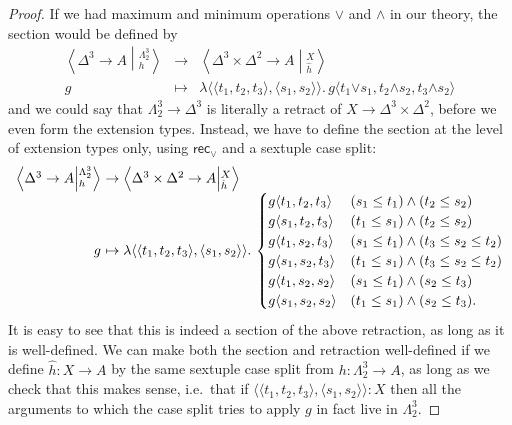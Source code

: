 \documentclass[12pt]{amsart}
\theoremstyle{plain}
\theoremstyle{definition}
\theoremstyle{remark}
\numberwithin{equation}{section}
\newcommand{\ndexten}[4]{\left\langle #1 \to #2 \middle|^{#3}_{#4}\right\rangle}
\newcommand{\pair}[1]{\langle #1\rangle}
\newcommand{\rec}{\mathsf{rec}}
\newcommand{\lam}[1]{\lambda #1.\,}
\begin{document}
\begin{proof}
  If we had maximum and minimum operations $\pmb{\lor}$ and $\pmb{\land}$ in our theory, the section would be defined by
  \[
  \begin{array}{ccc}
    \ndexten{\Delta^3}{A}{\Lambda^3_2}{h} & \to &\ndexten{\Delta^3\times\Delta^2}{A}{X}{\hat h}\\
    g & \mapsto & \lam{\pair{\pair{t_1,t_2,t_3},\pair{s_1,s_2}}} g\pair{t_1 \mathbin{\pmb{\lor}} s_1, t_2 \mathbin{\pmb{\land}} s_2, t_3 \mathbin{\pmb{\land}} s_2}
  \end{array}
  \]
  and we could say that $\Lambda^3_2 \to \Delta^3$ is literally a retract of $X \to \Delta^3\times \Delta^2$, before we even form the extension types.
  Instead, we have to define the section at the level of extension types only, using $\rec_\lor$ and a sextuple case split:
  \[
  \begin{array}{r@{}l}
    \ndexten{\Delta^3}{A}{\Lambda^3_2}{h}\  &\to  \ndexten{\Delta^3\times\Delta^2}{A}{X}{\hat h}\\
    g\  &\mapsto  \lam{\pair{\pair{t_1,t_2,t_3},\pair{s_1,s_2}}}
    \begin{cases}
      g\pair{t_1,t_2,t_3} & (s_1\le t_1) \land (t_2\le s_2)\\
      g\pair{s_1,t_2,t_3} & (t_1\le s_1) \land (t_2\le s_2)\\
      g\pair{t_1,s_2,t_3} & (s_1\le t_1) \land (t_3\le s_2\le t_2)\\
      g\pair{s_1,s_2,t_3} & (t_1\le s_1) \land (t_3\le s_2\le t_2)\\
      g\pair{t_1,s_2,s_2} & (s_1\le t_1) \land (s_2\le t_3)\\
      g\pair{s_1,s_2,s_2} & (t_1\le s_1) \land (s_2\le t_3).
    \end{cases}
  \end{array}
  \]
  It is easy to see that this is indeed a section of the above retraction, as long as it is well-defined.
  We can make both the section and retraction well-defined if we define $\hat h : X \to A$ by the same sextuple case split from $h:\Lambda^3_2\to A$, as long as we check that this makes sense, i.e.\ that if $\pair{\pair{t_1,t_2,t_3},\pair{s_1,s_2}}:X$ then all the arguments to which the case split tries to apply $g$ in fact live in $\Lambda^3_2$.


\end{proof}
\end{document}
